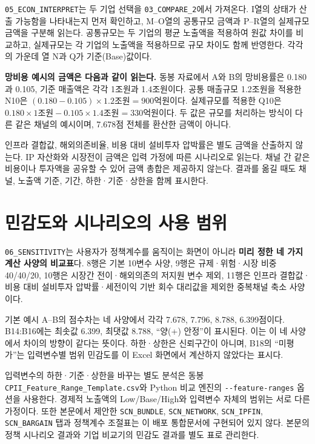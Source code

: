 \nolinkurl{05_ECON_INTERPRET}는 두 기업 선택을 \nolinkurl{03_COMPARE_2}에서 가져온다. I열의 상태가 산출 가능함을 나타내는지 먼저 확인하고, M--O열의 공통규모 금액과 P--R열의 실제규모 금액을 구분해 읽는다. 공통규모는 두 기업의 평균 노출액을 적용하여 원값 차이를 비교하고, 실제규모는 각 기업의 노출액을 적용하므로 규모 차이도 함께 반영한다. 각각의 가운데 열 N과 Q가 기준(Base)값이다.

\begin{ReportCallout}
\textbf{망비용 예시의 금액은 다음과 같이 읽는다.} 동봉 자료에서 A와 B의 망비용률은 0.180과 0.105, 기준 매출액은 각각 1조원과 1.4조원이다. 공통 매출규모 1.2조원을 적용한 N10은 \((0.180-0.105)\times1.2\text{조원}=900\text{억원}\)이다. 실제규모를 적용한 Q10은 \(0.180\times1\text{조원}-0.105\times1.4\text{조원}=330\text{억원}\)이다. 두 값은 규모를 처리하는 방식이 다른 같은 채널의 예시이며, 7.678점 전체를 환산한 금액이 아니다.
\end{ReportCallout}

인프라 결합값, 해외의존비율, 비용 대비 설비투자 압박률은 별도 금액을 산출하지 않는다. IP 자산화와 시장전이 금액은 입력 가정에 따른 시나리오로 읽는다. 채널 간 같은 비용이나 투자액을 공유할 수 있어 금액 총합은 제공하지 않는다. 결과를 옮길 때도 채널, 노출액 기준, 기간, 하한·기준·상한을 함께 표시한다.

\section{민감도와 시나리오의 사용 범위}

\nolinkurl{06_SENSITIVITY}는 사용자가 정책계수를 움직이는 화면이 아니라 \textbf{미리 정한 네 가지 계산 사양의 비교표}다. 8행은 기본 10변수 사양, 9행은 규제·위험·시장 비중 40/40/20, 10행은 시장간 전이·해외의존의 저지원 변수 제외, 11행은 인프라 결합값·비용 대비 설비투자 압박률·세전이익 기반 회수 대리값을 제외한 중복채널 축소 사양이다.

기본 예시 A--B의 점수차는 네 사양에서 각각 7.678, 7.796, 8.788, 6.399점이다. B14:B16에는 최솟값 6.399, 최댓값 8.788, ``양(+) 안정''이 표시된다. 이는 이 네 사양에서 차이의 방향이 같다는 뜻이다. 하한·상한은 신뢰구간이 아니며, B18의 ``미평가''는 입력변수별 범위 민감도를 이 Excel 화면에서 계산하지 않았다는 표시다.

입력변수의 하한·기준·상한을 바꾸는 별도 분석은 동봉 \nolinkurl{CPII_Feature_Range_Template.csv}와 Python 비교 엔진의 \nolinkurl{--feature-ranges} 옵션을 사용한다. 경제적 노출액의 Low/Base/High와 입력변수 자체의 범위는 서로 다른 가정이다. 또한 본문에서 제안한 \nolinkurl{SCN_BUNDLE}, \nolinkurl{SCN_NETWORK}, \nolinkurl{SCN_IPFIN}, \nolinkurl{SCN_BARGAIN} 탭과 정책계수 조절표는 이 배포 통합문서에 구현되어 있지 않다. 본문의 정책 시나리오 결과와 기업 비교기의 민감도 결과를 별도 표로 관리한다.

